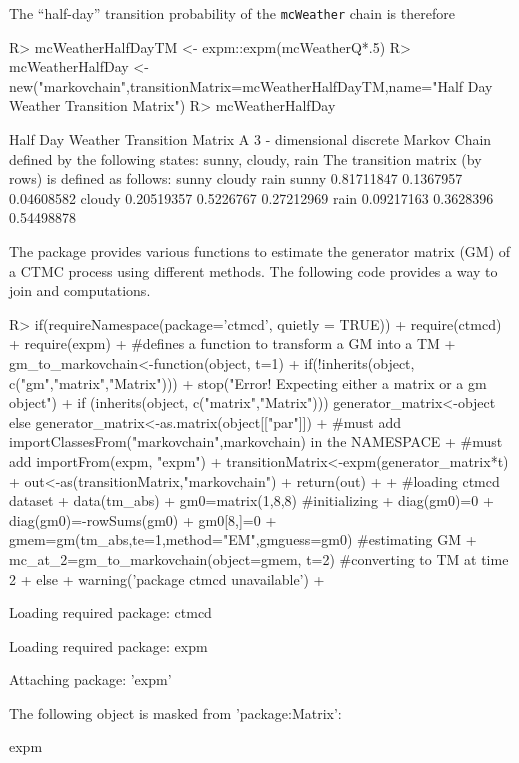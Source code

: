 \documentclass[
  nojss]{jss}
\begin{document}
The ``half-day'' transition probability of the \texttt{mcWeather} chain is therefore

\begin{CodeChunk}
\begin{CodeInput}
R> mcWeatherHalfDayTM <- expm::expm(mcWeatherQ*.5)
R> mcWeatherHalfDay <- new("markovchain",transitionMatrix=mcWeatherHalfDayTM,name="Half Day Weather Transition Matrix")
R> mcWeatherHalfDay
\end{CodeInput}
\begin{CodeOutput}
Half Day Weather Transition Matrix 
 A  3 - dimensional discrete Markov Chain defined by the following states: 
 sunny, cloudy, rain 
 The transition matrix  (by rows)  is defined as follows: 
            sunny    cloudy       rain
sunny  0.81711847 0.1367957 0.04608582
cloudy 0.20519357 0.5226767 0.27212969
rain   0.09217163 0.3628396 0.54498878
\end{CodeOutput}
\end{CodeChunk}

The  package \citep{pkg:ctmcd} provides various functions to estimate the generator matrix (GM) of a CTMC process using different methods. The following code provides a way to join  and  computations.

\begin{CodeChunk}
\begin{CodeInput}
R> if(requireNamespace(package='ctmcd', quietly = TRUE)) {
+ require(ctmcd)
+ require(expm)
+ #defines a function to transform a GM into a TM
+ gm_to_markovchain<-function(object, t=1) {
+   if(!inherits(object, c("gm","matrix","Matrix")))
+     stop("Error! Expecting either a matrix or a gm object")
+   if (inherits(object, c("matrix","Matrix"))) generator_matrix<-object else generator_matrix<-as.matrix(object[["par"]])
+   #must add importClassesFrom("markovchain",markovchain) in the NAMESPACE
+   #must add importFrom(expm, "expm")
+   transitionMatrix<-expm(generator_matrix*t)
+   out<-as(transitionMatrix,"markovchain")
+   return(out)
+ }
+ #loading ctmcd dataset
+ data(tm_abs)
+ gm0=matrix(1,8,8) #initializing
+ diag(gm0)=0
+ diag(gm0)=-rowSums(gm0)
+ gm0[8,]=0
+ gmem=gm(tm_abs,te=1,method="EM",gmguess=gm0) #estimating GM
+ mc_at_2=gm_to_markovchain(object=gmem, t=2) #converting to TM at time 2
+ } else {
+   warning('package ctmcd unavailable')
+ }
\end{CodeInput}
\begin{CodeOutput}
Loading required package: ctmcd
\end{CodeOutput}
\begin{CodeOutput}
Loading required package: expm
\end{CodeOutput}
\begin{CodeOutput}

Attaching package: 'expm'
\end{CodeOutput}
\begin{CodeOutput}
The following object is masked from 'package:Matrix':

    expm
\end{CodeOutput}
\end{CodeChunk}
\end{document}
